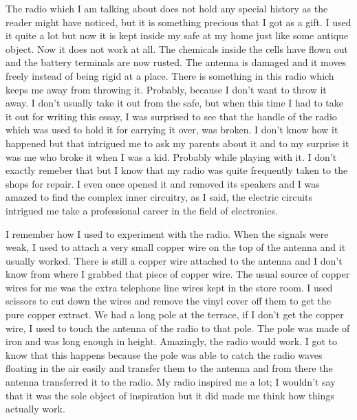 \documentclass{article}
\begin{document}
\par The radio which I am talking about does not hold any special history as the reader might have noticed, but it is something precious that I got as a gift. I used it quite a lot but now it is kept inside my safe at my home just like some antique object. Now it does not work at all. The chemicals inside the cells have flown out and the battery terminals are now rusted. The antenna is damaged and it moves freely instead of being rigid at a place. There is something in this radio which keeps me away from throwing it. Probably, because I don't want to throw it away. I don't usually take it out from the safe, but when this time I had to take it out for writing this essay, I was surprised to see that the handle of the radio which was used to hold it for carrying it over, was broken. I don't know how it happened but that intrigued me to ask my parents about it and to my surprise it was me who broke it when I was a kid. Probably while playing with it. I don't exactly remeber that but I know that my radio was quite frequently taken to the shops for repair. I even once opened it and removed its speakers and I was amazed to find the complex inner circuitry, as I said, the electric circuits intrigued me take a professional career in the field of electronics.

\par I remember how I used to experiment with the radio. When the signals were weak, I used to attach a very small copper wire on the top of the antenna and it usually worked. There is still a copper wire attached to the antenna and I don't know from where I grabbed that piece of copper wire. The usual source of copper wires for me was the extra telephone line wires kept in the store room. I used scissors to cut down the wires and remove the vinyl cover off them to get the pure copper extract. We had a long pole at the terrace, if I don't get the copper wire, I used to touch the antenna of the radio to that pole. The pole was made of iron and was long enough in height. Amazingly, the radio would work. I got to know that this happens because the pole was able to catch the radio waves floating in the air easily and transfer them to the antenna and from there the antenna transferred it to the radio. My radio inspired me a lot; I wouldn't say that it was the sole object of inspiration but it did made me think how things actually work.
\end{document}
